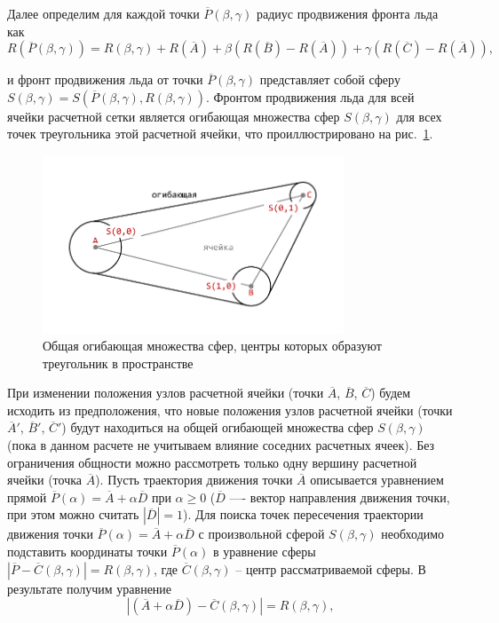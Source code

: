 Далее определим для каждой точки $\overline{P}(\beta,\gamma)$ радиус продвижения фронта льда как
\begin{equation}
	R(\overline{P}(\beta,\gamma)) = R(\beta,\gamma) + R(\overline{A}) + \beta(R(\overline{B}) - R(\overline{A})) + \gamma(R(\overline{C}) - R(\overline{A})),
\end{equation}

и фронт продвижения льда от точки $\overline{P}(\beta,\gamma)$ представляет собой сферу $S(\beta,\gamma) = S(\overline{P}(\beta,\gamma),R(\beta,\gamma))$.
Фронтом продвижения льда для всей ячейки расчетной сетки является огибающая множества сфер $S(\beta,\gamma)$ для всех точек треугольника этой расчетной ячейки, что проиллюстрировано на рис.~\ref{fig:text_1_remesh_common_envelope_1}.

\begin{figure}[ht]
	\centering
		\includegraphics[width=0.80\textwidth]{./pics/text_1_remesh_common_envelope/triangle.pdf}
	\caption{Общая огибающая множества сфер, центры которых образуют треугольник в пространстве}
	\label{fig:text_1_remesh_common_envelope_1}
\end{figure}

При изменении положения узлов расчетной ячейки (точки $\overline{A}$, $\overline{B}$, $\overline{C}$) будем исходить из предположения, что новые положения узлов расчетной ячейки (точки $\overline{A}'$, $\overline{B}'$, $\overline{C}'$) будут находиться на общей огибающей множества сфер $S(\beta,\gamma)$ (пока в данном расчете не учитываем влияние соседних расчетных ячеек).
Без ограничения общности можно рассмотреть только одну вершину расчетной ячейки (точка $\overline{A}$).
Пусть траектория движения точки $\overline{A}$ описывается уравнением прямой $\overline{P}(\alpha) = \overline{A} + \alpha \overline{D}$ при $\alpha \ge 0$ ($\overline{D}$ —- вектор направления движения точки, при этом можно считать $|\overline{D}| = 1$).
Для поиска точек пересечения траектории движения точки $\overline{P}(\alpha) = \overline{A} + \alpha \overline{D}$ с произвольной сферой $S(\beta,\gamma)$ необходимо подставить координаты точки $\overline{P}(\alpha)$ в уравнение сферы $|\overline{P} - \overline{C}(\beta,\gamma)| = R(\beta,\gamma)$, где $\overline{C}(\beta,\gamma)$ -- центр рассматриваемой сферы.
В результате получим уравнение
\begin{equation}
	|(\overline{A} + \alpha \overline{D}) - \overline{C}(\beta, \gamma)| = R(\beta, \gamma),
\end{equation}


